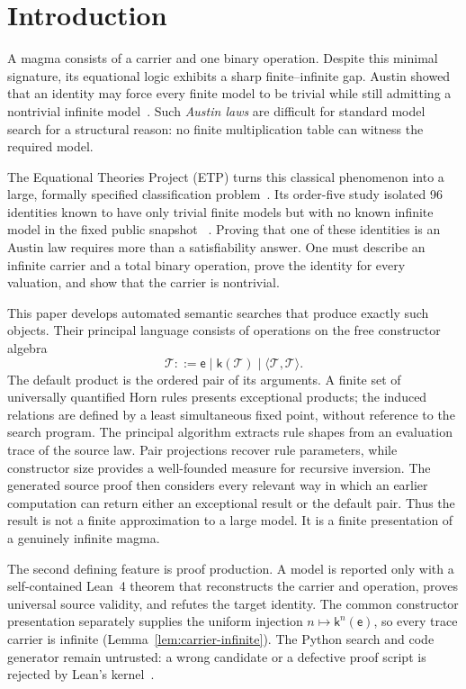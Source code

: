\documentclass[runningheads]{llncs}
\newcommand{\Tree}{\mathcal{T}}
\newcommand{\pair}[2]{\langle #1,#2\rangle}
\begin{document}
\section{Introduction}

A magma consists of a carrier and one binary operation.  Despite this minimal
signature, its equational logic exhibits a sharp finite--infinite gap.  Austin
showed that an identity may force every finite model to be trivial while still
admitting a nontrivial infinite model~\cite{Austin1965,Austin1966}.  Such
\emph{Austin laws} are difficult for standard model search for a structural
reason: no finite multiplication table can witness the required model.

The Equational Theories Project (ETP) turns this classical phenomenon into a
large, formally specified classification problem~\cite{BolanEtAl2025}.  Its
order-five study isolated 96 identities known to have only trivial finite
models but with no known infinite model in the fixed public snapshot
~\cite{ETPOrder5Austin}.  Proving that one of these identities is an Austin law
requires more than a satisfiability answer.  One must describe an infinite
carrier and a total binary operation, prove the identity for every valuation,
and show that the carrier is nontrivial.

This paper develops automated semantic searches that produce exactly such
objects.  Their principal language consists of operations on the free
constructor algebra
\[
  \Tree ::= \mathsf e \mid \mathsf k(\Tree)
          \mid \pair{\Tree}{\Tree}.
\]
The default product is the ordered pair of its arguments.  A finite set of
universally quantified Horn rules presents exceptional products; the induced
relations are defined by a least simultaneous fixed point, without reference
to the search program.  The principal algorithm extracts rule shapes from an
evaluation trace of the source law.  Pair projections recover rule parameters,
while constructor size provides a well-founded measure for recursive
inversion.  The generated source proof then considers every relevant way in
which an earlier computation can return either an exceptional result or the
default pair.  Thus the result is not a finite approximation to a large model.
It is a finite presentation of a genuinely infinite magma.

The second defining feature is proof production.  A model is reported only
with a self-contained Lean~4 theorem that reconstructs the carrier and
operation, proves universal source validity, and refutes the target identity.
The common constructor presentation separately supplies the uniform injection
\(n\mapsto\mathsf k^n(\mathsf e)\), so every trace carrier is infinite
(Lemma~\ref{lem:carrier-infinite}).  The Python search and code generator
remain untrusted: a wrong candidate or a defective proof script is rejected
by Lean's kernel~\cite{deMouraUllrich2021,Mathlib2020}.
\end{document}
